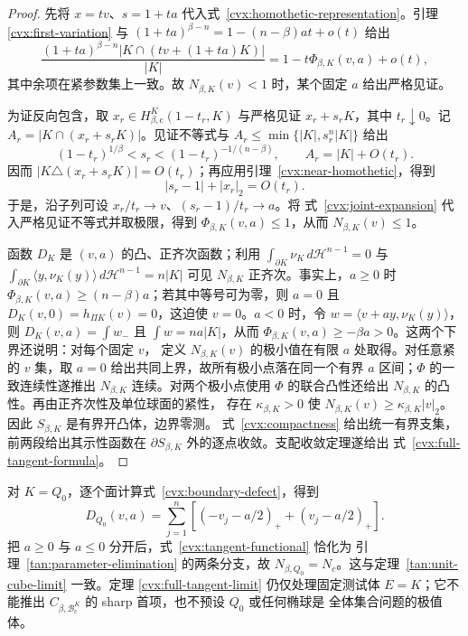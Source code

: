 \begin{proof}
先将 $x=tv$、$s=1+ta$ 代入式~\eqref{cvx:homothetic-representation}。引理
\ref{cvx:first-variation} 与
$(1+ta)^{\beta-n}=1-(n-\beta)at+o(t)$ 给出
\begin{equation}
 \frac{(1+ta)^{\beta-n}|K\cap(tv+(1+ta)K)|}{|K|}
 =1-t\Phi_{\beta,K}(v,a)+o(t),
 \label{cvx:joint-expansion}
\end{equation}
其中余项在紧参数集上一致。故 $N_{\beta,K}(v)<1$ 时，某个固定 $a$ 给出严格见证。

为证反向包含，取 $x_r\in H^K_{\beta,\mathrm c}(1-t_r,K)$ 与严格见证
$x_r+s_rK$，其中 $t_r\downarrow0$。记 $A_r=|K\cap(x_r+s_rK)|$。见证不等式与
$A_r\le\min\{|K|,s_r^n|K|\}$ 给出
\[
 (1-t_r)^{1/\beta}<s_r<(1-t_r)^{-1/(n-\beta)},
 \qquad A_r=|K|+O(t_r).
\]
因而 $|K\triangle(x_r+s_rK)|=O(t_r)$；再应用引理~\ref{cvx:near-homothetic}，得到
\begin{equation}
 |s_r-1|+|x_r|_2=O(t_r).
 \label{cvx:compactness}
\end{equation}
于是，沿子列可设 $x_r/t_r\to v$、$(s_r-1)/t_r\to a$。将
式~\eqref{cvx:joint-expansion} 代入严格见证不等式并取极限，得到
$\Phi_{\beta,K}(v,a)\le1$，从而 $N_{\beta,K}(v)\le1$。

函数 $D_K$ 是 $(v,a)$ 的凸、正齐次函数；利用
$\int_{\partial K}\nu_K\,d\mathcal H^{n-1}=0$ 与
$\int_{\partial K}\langle y,\nu_K(y)\rangle\,d\mathcal H^{n-1}=n|K|$ 可见
$N_{\beta,K}$ 正齐次。事实上，$a\ge0$ 时
$\Phi_{\beta,K}(v,a)\ge(n-\beta)a$；若其中等号可为零，则 $a=0$ 且
$D_K(v,0)=h_{\Pi K}(v)=0$，这迫使 $v=0$。$a<0$ 时，令
$w=\langle v+ay,\nu_K(y)\rangle$，则
$D_K(v,a)=\int w_-$ 且 $\int w=na|K|$，从而
$\Phi_{\beta,K}(v,a)\ge-\beta a>0$。这两个下界还说明：对每个固定 $v$，
定义 $N_{\beta,K}(v)$ 的极小值在有限 $a$ 处取得。对任意紧的 $v$ 集，取 $a=0$ 给出共同上界，故所有极小点落在同一个有界 $a$ 区间；$\Phi$ 的一致连续性遂推出 $N_{\beta,K}$ 连续。对两个极小点使用 $\Phi$ 的联合凸性还给出 $N_{\beta,K}$ 的凸性。再由正齐次性及单位球面的紧性，
存在 $\kappa_{\beta,K}>0$ 使 $N_{\beta,K}(v)\ge\kappa_{\beta,K}|v|_2$。
因此 $S_{\beta,K}$ 是有界开凸体，边界零测。
式~\eqref{cvx:compactness} 给出统一有界支集，前两段给出其示性函数在
$\partial S_{\beta,K}$ 外的逐点收敛。支配收敛定理遂给出
式~\eqref{cvx:full-tangent-formula}。
\end{proof}

\begin{remark}[方体特例与全体常数的界限]
\label{cvx:cube-specialization}
对 $K=Q_0$，逐个面计算式~\eqref{cvx:boundary-defect}，得到
\[
 D_{Q_0}(v,a)=\sum_{j=1}^{n}
 \left[(-v_j-a/2)_++(v_j-a/2)_+\right].
\]
把 $a\ge0$ 与 $a\le0$ 分开后，式~\eqref{cvx:tangent-functional} 恰化为
引理~\ref{tan:parameter-elimination} 的两条分支，故
$N_{\beta,Q_0}=N_c$。这与定理~\ref{tan:unit-cube-limit} 一致。定理
\ref{cvx:full-tangent-limit} 仍仅处理固定测试体 $E=K$；它不能推出
$C_{\beta,\mathcal B^K_{\mathrm c}}$ 的 sharp 首项，也不预设 $Q_0$ 或任何椭球是
全体集合问题的极值体。
\end{remark}

